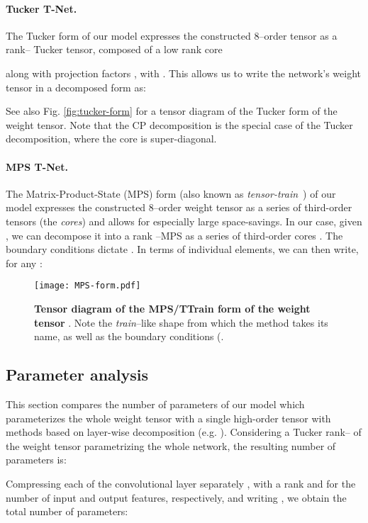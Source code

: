 \documentclass[10pt,twocolumn,letterpaper]{article}
\begin{document}
\paragraph{Tucker T-Net.} The Tucker form of our model expresses the constructed 8\myth--order tensor  as a rank-- Tucker tensor, composed of a low rank core 
 
along with projection factors
, with .  This allows us to write the network's weight tensor in a decomposed form as:

See also Fig. \ref{fig:tucker-form} for a tensor diagram of the Tucker form of the weight tensor. Note that the CP decomposition is the special case of the Tucker decomposition, where the core is super-diagonal.

\paragraph{MPS T-Net.} The Matrix-Product-State (MPS) form (also known as \emph{tensor-train}~\cite{oseledets2011tensor}) of our model expresses the constructed 8\myth--order weight tensor  as a series of third-order tensors (the \emph{cores}) and allows for especially large space-savings. In our case, given , 
we can decompose it into a rank --MPS as a series of third-order cores . The boundary conditions dictate . In terms of individual elements, we can then write, for any :


\begin{figure}
    \centering
    \texttt{[image: MPS-form.pdf]}
    \caption{\textbf{Tensor diagram of the MPS/TTrain form of the weight tensor }. Note the \emph{train}--like shape from which the method takes its name, as well as the boundary conditions (.}
    \label{fig:mps-form}
\end{figure}

\subsection{Parameter analysis}

This section compares the number of parameters of our model which parameterizes the whole weight tensor with a single high-order tensor with methods based on layer-wise decomposition (e.g. \cite{yong2015compression, lebedev2014speeding}). Considering a Tucker rank-- of the weight tensor parametrizing the whole network, the resulting number of parameters is:



Compressing each of the  convolutional layer separately \cite{yong2015compression}, with a rank  and  for the number of input and output features, respectively,  and writing , we obtain the total number of parameters: 
\end{document}
